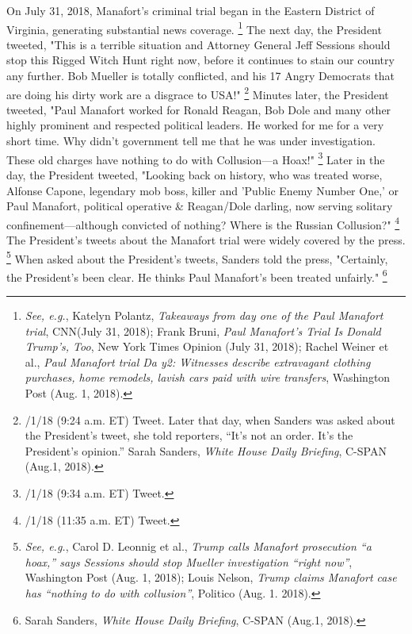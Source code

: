 On July 31, 2018, Manafort's criminal trial began in the Eastern District of Virginia, generating substantial news coverage.%
\footnote{\textit{See, e.g.}, Katelyn Polantz, \textit{Takeaways from day one of the Paul Manafort trial}, CNN(July 31, 2018);
Frank Bruni, \textit{Paul Manafort’s Trial Is Donald Trump's, Too}, New York Times Opinion (July 31, 2018);
Rachel Weiner et al., \textit{Paul Manafort trial Da y2: Witnesses describe extravagant clothing purchases, home remodels, lavish cars paid with wire transfers}, Washington Post (Aug. 1, 2018).}
The next day, the President tweeted, "This is a terrible situation and Attorney General Jeff Sessions should stop this Rigged Witch Hunt right now, before it continues to stain our country any further.
Bob Mueller is totally conflicted, and his 17 Angry Democrats that are doing his dirty work are a disgrace to USA!"%
\footnote{/1/18 (9:24 a.m. ET) Tweet.
Later that day, when Sanders was asked about the President’s tweet, she told reporters, “It’s not an order.
It’s the President’s opinion.”
Sarah Sanders, \textit{White House Daily Briefing}, C-SPAN (Aug.1, 2018).}
Minutes later, the President tweeted, "Paul Manafort worked for Ronald Reagan, Bob Dole and many other highly prominent and respected political leaders.
He worked for me for a very short time.
Why didn't government tell me that he was under investigation.
These old charges have nothing to do with Collusion—a Hoax!"%
\footnote{/1/18 (9:34 a.m. ET) Tweet.}
Later in the day, the President tweeted, "Looking back on history, who was treated worse, Alfonse Capone, legendary mob boss, killer and 'Public Enemy Number One,' or Paul Manafort, political operative \& Reagan/Dole darling, now serving solitary confinement—although convicted of nothing?
Where is the Russian Collusion?"%
\footnote{/1/18 (11:35 a.m. ET) Tweet.}
The President's tweets about the Manafort trial were widely covered by the press.%
\footnote{\textit{See, e.g.}, Carol D. Leonnig et al., \textit{Trump calls Manafort prosecution “a hoax,” says Sessions should stop Mueller investigation “right now”}, Washington Post (Aug. 1, 2018);
Louis Nelson, \textit{Trump claims Manafort case has “nothing to do with collusion”}, Politico (Aug. 1. 2018).}
When asked about the President's tweets, Sanders told the press, "Certainly, the President's been clear.
He thinks Paul Manafort's been treated unfairly."%
\footnote{Sarah Sanders, \textit{White House Daily Briefing}, C-SPAN (Aug.1, 2018).}

